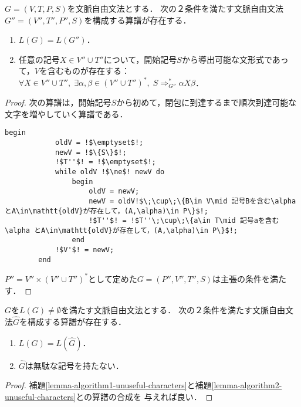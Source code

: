 \begin{lemma}[開始記号から到達可能でない文字の除去算譜]\label{lemma-algorithm2-unuseful-characters}
    $G=(V,T,P,S)$を文脈自由文法とする．
    次の２条件を満たす文脈自由文法$G''=(V'',T'',P'',S)$を構成する算譜が存在する．
    \begin{enumerate}
        \item $L(G)=L(G'')$．
        \item 任意の記号$X\in V''\cup T''$について，開始記号$S$から導出可能な文形式であって，$V$を含むものが存在する：$\forall X\in V''\cup T'',\;\exists\alpha,\beta\in(V''\cup T'')^*,\;S\Rightarrow^*_{G''}\alpha X\beta$．
    \end{enumerate}
\end{lemma}
\begin{proof}
    次の算譜は，開始記号$S$から初めて，閉包に到達するまで順次到達可能な文字を増やしていく算譜である．
    \begin{lstlisting}[escapechar=!]
        begin
            oldV = !$\emptyset$!;
            newV = !$\{S\}$!;
            !$T''$! = !$\emptyset$!;
            while oldV !$\ne$! newV do
                begin
                    oldV = newV;
                    newV = oldV!$\;\cup\;\{B\in V\mid 記号Bを含む\alpha とA\in\mathtt{oldV}が存在して，(A,\alpha)\in P\}$!;
                    !$T''$! = !$T''\;\cup\;\{a\in T\mid 記号aを含む\alpha とA\in\mathtt{oldV}が存在して，(A,\alpha)\in P\}$!;
                end
            !$V'$! = newV;
        end
    \end{lstlisting}
    $P''=V''\times(V''\cup T'')^*$として定めた$G=(P'',V'',T'',S)$は主張の条件を満たす．
\end{proof}

\begin{theorem}[無駄な記号の除去算譜]\label{thm-CFL-elimination-1}
    $G$を$L(G)\ne\emptyset$を満たす文脈自由文法とする．
    次の２条件を満たす文脈自由文法$\hat{G}$を構成する算譜が存在する．
    \begin{enumerate}
        \item $L(G)=L(\hat{G})$．
        \item $\hat{G}$は無駄な記号を持たない．
    \end{enumerate}
\end{theorem}
\begin{proof}
    補題\ref{lemma-algorithm1-unuseful-characters}と補題\ref{lemma-algorithm2-unuseful-characters}との算譜の合成を
    与えれば良い．
\end{proof}

